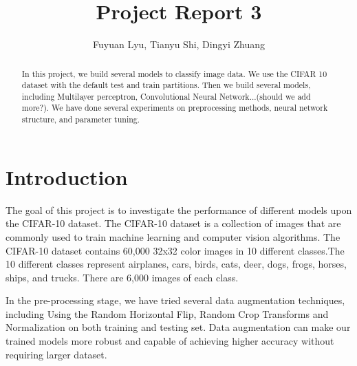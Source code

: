 \documentclass[11pt]{scrartcl}
\title{Project Report 3}
\author{Fuyuan Lyu, Tianyu Shi, Dingyi Zhuang}
\begin{document}
\maketitle

\begin{abstract}
In this project, we build several models to classify image data. We use the CIFAR 10 dataset with the default test and train partitions.
Then we build several models, including Multilayer perceptron, Convolutional Neural Network...(should we add more?). We have done several experiments on preprocessing methods, neural network structure, and parameter tuning.
\end{abstract}
  
\section{Introduction}
The goal of this project is to investigate the performance of different models upon the CIFAR-10 dataset. The CIFAR-10 dataset is a collection of images that are commonly used to train machine learning and computer vision algorithms. The CIFAR-10 dataset contains 60,000 32x32 color images in 10 different classes.The 10 different classes represent airplanes, cars, birds, cats, deer, dogs, frogs, horses, ships, and trucks. There are 6,000 images of each class.

In the pre-processing stage, we have tried several data augmentation techniques, including Using the Random Horizontal Flip, Random Crop Transforms and Normalization on both training and testing set. Data augmentation can make our trained models more robust and capable of achieving higher accuracy without requiring larger dataset.



\end{document}
